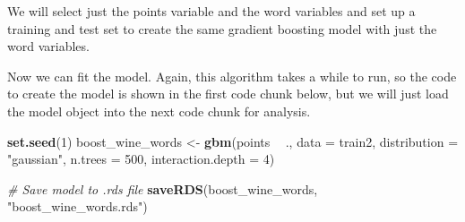 \documentclass[12pt,twoside]{amherstthesis}
\newenvironment{Shaded}{\begin{snugshade}}{\end{snugshade}}
\newcommand{\KeywordTok}[1]{\textcolor[rgb]{0.13,0.29,0.53}{\textbf{#1}}}
\newcommand{\DataTypeTok}[1]{\textcolor[rgb]{0.13,0.29,0.53}{#1}}
\newcommand{\DecValTok}[1]{\textcolor[rgb]{0.00,0.00,0.81}{#1}}
\newcommand{\FloatTok}[1]{\textcolor[rgb]{0.00,0.00,0.81}{#1}}
\newcommand{\StringTok}[1]{\textcolor[rgb]{0.31,0.60,0.02}{#1}}
\newcommand{\CommentTok}[1]{\textcolor[rgb]{0.56,0.35,0.01}{\textit{#1}}}
\newcommand{\OperatorTok}[1]{\textcolor[rgb]{0.81,0.36,0.00}{\textbf{#1}}}
\newcommand{\NormalTok}[1]{#1}
\begin{document}
We will select just the points variable and the word variables and set
up a training and test set to create the same gradient boosting model
with just the word variables.
\begin{Shaded}
\end{Shaded}
Now we can fit the model. Again, this algorithm takes a while to run, so
the code to create the model is shown in the first code chunk below, but
we will just load the model object into the next code chunk for
analysis.
\begin{Shaded}
\begin{Highlighting}[]
\KeywordTok{set.seed}\NormalTok{(}\DecValTok{1}\NormalTok{)}
\NormalTok{boost_wine_words <-}\StringTok{ }\KeywordTok{gbm}\NormalTok{(points }\OperatorTok{~}\StringTok{ }\NormalTok{., }
                   \DataTypeTok{data =}\NormalTok{ train2, }
                   \DataTypeTok{distribution =} \StringTok{"gaussian"}\NormalTok{, }
                   \DataTypeTok{n.trees =} \DecValTok{500}\NormalTok{,}
                   \DataTypeTok{interaction.depth =} \DecValTok{4}\NormalTok{)}

\CommentTok{# Save model to .rds file}
\KeywordTok{saveRDS}\NormalTok{(boost_wine_words, }\StringTok{"boost_wine_words.rds"}\NormalTok{)}
\end{Highlighting}
\end{Shaded}
\end{document}
